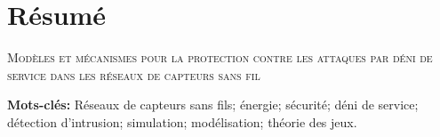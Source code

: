 \chapter[Résumé (français)]{Résumé}

\begin{center}
    \LARGE\scshape\color{chapterLACL}Modèles et mécanismes pour la protection contre les attaques par déni de service dans les réseaux de capteurs sans fil
\end{center}
\vspace{2\baselineskip}



\vspace{2\baselineskip}
\noindent\textbf{Mots-clés:} Réseaux de capteurs sans fils; énergie; sécurité; déni de service; détection d'intrusion; simulation; modélisation; théorie des jeux.
